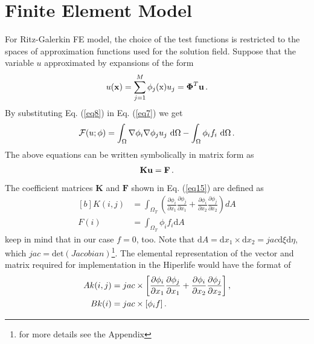 \documentclass[]{article}
\begin{document}
\section{Finite Element Model} \label{sec: fem}
For Ritz-Galerkin FE model, the choice of the test functions is restricted to the spaces of approximation functions used for the solution field. Suppose that the variable $u$ approximated by expansions of the form
\begin{equation}\label{eq8}
	\begin{aligned}
		u(\mathbf{x})= \sum_{j=1}^{M} \phi_j(\mathrm{x}) u_j = \boldsymbol{\Phi}^T\mathbf{u} \thinspace.
	\end{aligned}
\end{equation}
By substituting Eq. (\ref{eq8}) in Eq. (\ref{eq7}) we get
\begin{equation}\label{eq9}
	\begin{aligned}[b]
		\mathcal{F}(u; \phi)=\int_\Omega  \nabla \phi_i \nabla \phi_j u_j\ \mathrm{d} \Omega - \int_\Omega \phi_i f_i \ \mathrm{d} \Omega\thinspace.
	\end{aligned}
\end{equation}
The above equations can be written symbolically in matrix form as
\begin{equation}\label{eq10}
	\begin{aligned}
		\mathbf{K}\mathbf{u} = \mathbf{F}\thinspace.
	\end{aligned}
\end{equation}
The coefficient matrices $\mathbf{K}$ and $\mathbf{F}$ shown in Eq. (\ref{eq15}) are defined as
\begin{equation}\label{eq11}
	\begin{aligned}[b]
		K(i,j) &= \int_{\Omega_{T}} (\frac{\partial \phi_{i}}{\partial x_{1}}
		\frac{\partial \phi_{j}}{\partial x_{1}}+\frac{\partial \phi_{i}}{\partial x_{2}} 
		\frac{\partial \phi_{j}}{\partial x_{2}}) dA\\
		F(i) &= \int_{\Omega_{T}} \phi_{i}f_i \mathrm{d}A
	\end{aligned}
\end{equation}
keep in mind that in our case $f=0$, too. Note that $\mathrm{d}A=\mathrm{d}x_{1} \times \mathrm{d}x_{2}=jac\mathrm{d}\xi \mathrm{d}\eta$, which $jac=\mathrm{det}(Jacobian)$\footnote{for more details see the Appendix}. The elemental representation of the vector and matrix required for implementation in the Hiperlife would have the format of 
\begin{equation}\label{eq12}
	\begin{aligned}[b]
		Ak(i,j) &= jac \times \left[\frac{\partial \phi_{i}}{\partial x_{1}}
		\frac{\partial \phi_{j}}{\partial x_{1}}+\frac{\partial \phi_{i}}{\partial x_{2}} \frac{\partial \phi_{j}}{\partial x_{2}}\right], \\
		Bk(i) &= jac \times [\phi_{i}f]\thinspace .
	\end{aligned}
\end{equation}
\end{document}
